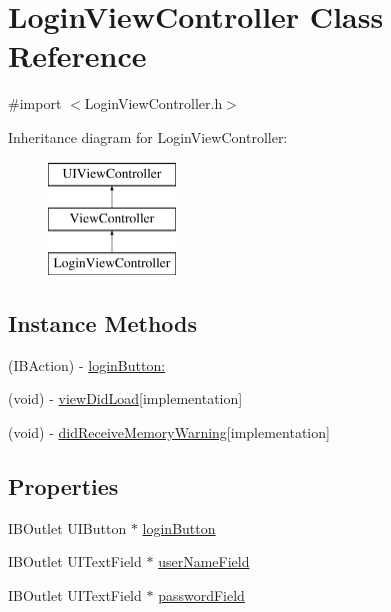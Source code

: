 \hypertarget{interface_login_view_controller}{}\section{Login\+View\+Controller Class Reference}
\label{interface_login_view_controller}


{\ttfamily \#import $<$Login\+View\+Controller.\+h$>$}

Inheritance diagram for Login\+View\+Controller\+:\begin{figure}[H]
\begin{center}
\leavevmode
\includegraphics[height=3.000000cm]{interface_login_view_controller}
\end{center}
\end{figure}
\subsection*{Instance Methods}
\begin{DoxyCompactItemize}
\item 
(I\+B\+Action) -\/ \hyperlink{interface_login_view_controller_a2fb8213f4fc594a07c7632893bffe055}{login\+Button\+:}
\item 
(void) -\/ \hyperlink{interface_login_view_controller_aefcc82e0891883acdcad63d4a2854afc}{view\+Did\+Load}{\ttfamily  \mbox{[}implementation\mbox{]}}
\item 
(void) -\/ \hyperlink{interface_login_view_controller_ab9cdc48f1f6ed27f8bb8e4dbb6a12e72}{did\+Receive\+Memory\+Warning}{\ttfamily  \mbox{[}implementation\mbox{]}}
\end{DoxyCompactItemize}
\subsection*{Properties}
\begin{DoxyCompactItemize}
\item 
I\+B\+Outlet U\+I\+Button $\ast$ \hyperlink{interface_login_view_controller_a708d71181afc3cf64b48b9e8ef0b7411}{login\+Button}
\item 
I\+B\+Outlet U\+I\+Text\+Field $\ast$ \hyperlink{interface_login_view_controller_a7a4a67075fd3a3c5f862ab4e50ba5b82}{user\+Name\+Field}
\item 
I\+B\+Outlet U\+I\+Text\+Field $\ast$ \hyperlink{interface_login_view_controller_a7069e68973d8dc49728a8ada392482cf}{password\+Field}
\end{DoxyCompactItemize}


